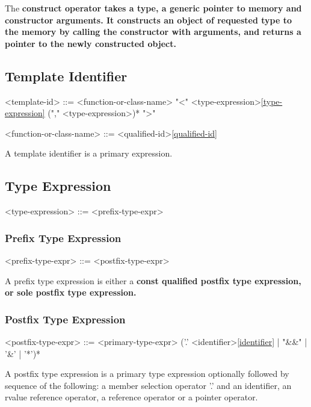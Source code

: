 \documentclass[a4paper,oneside,11pt]{article}
\begin{document}
The \bf{construct} operator takes a type, a generic pointer to memory and constructor arguments.
It constructs an object of requested type to the memory by calling the constructor with arguments,
and returns a pointer to the newly constructed object.

\subsection{Template Identifier}\label{sec:templateid}
\begin{grammar}
\label{template-id}<template-id> ::= <function-or-class-name> "<" <type-expression>\ref{type-expression} ("," <type-expression>)* ">"

<function-or-class-name> ::= <qualified-id>\ref{qualified-id}
\end{grammar}

A template identifier is a primary expression.

\subsection{Type Expression}

\begin{grammar}
\label{type-expression}<type-expression> ::= <prefix-type-expr>
\end{grammar}

\subsubsection{Prefix Type Expression}

\begin{grammar}
<prefix-type-expr> ::=  <postfix-type-expr>
\end{grammar}

A prefix type expression is either a \bf{const} qualified postfix type expression,
or sole postfix type expression.

\subsubsection{Postfix Type Expression}

\begin{grammar}
<postfix-type-expr> ::= <primary-type-expr> ('.' <identifier>\ref{identifier} | "&&" | '\&' | '*')*
\end{grammar}

A postfix type expression is a primary type expression optionally followed by sequence of the
following:
a member selection operator '.' and an identifier, an rvalue reference operator, a reference operator
or a pointer operator.
\end{document}
